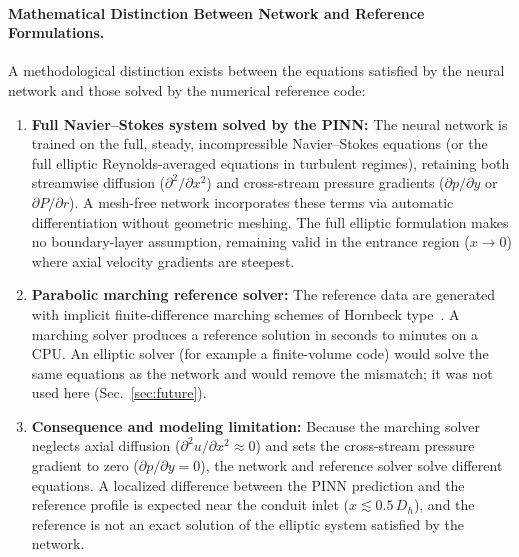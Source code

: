 \documentclass[11pt,a4paper]{article}
\begin{document}
\paragraph{Mathematical Distinction Between Network and Reference Formulations.}
\label{sec:elliptic_vs_parabolic}
A methodological distinction exists between the equations satisfied by the neural network and those solved by the numerical reference code:
\begin{enumerate}[label=(\roman*)]
\item \textbf{Full Navier--Stokes system solved by the PINN:} The neural network is trained on the full, steady, incompressible Navier--Stokes equations (or the full elliptic Reynolds-averaged equations in turbulent regimes), retaining both streamwise diffusion ($\partial^2/\partial x^2$) and cross-stream pressure gradients ($\partial p/\partial y$ or $\partial P/\partial r$). A mesh-free network incorporates these terms via automatic differentiation without geometric meshing. The full elliptic formulation makes no boundary-layer assumption, remaining valid in the entrance region ($x \to 0$) where axial velocity gradients are steepest.
\item \textbf{Parabolic marching reference solver:} The reference data are generated with implicit finite-difference marching schemes of Hornbeck type~\cite[Chs.~6--7, pp.~153--202]{hornbeck1973}. A marching solver produces a reference solution in seconds to minutes on a CPU. An elliptic solver (for example a finite-volume code) would solve the same equations as the network and would remove the mismatch; it was not used here (Sec.~\ref{sec:future}).
\item \textbf{Consequence and modeling limitation:} Because the marching solver neglects axial diffusion ($\partial^2 u/\partial x^2 \approx 0$) and sets the cross-stream pressure gradient to zero ($\partial p/\partial y = 0$), the network and reference solver solve different equations. A localized difference between the PINN prediction and the reference profile is expected near the conduit inlet ($x \lesssim 0.5\,D_h$), and the reference is not an exact solution of the elliptic system satisfied by the network.
\end{enumerate}
\end{document}
